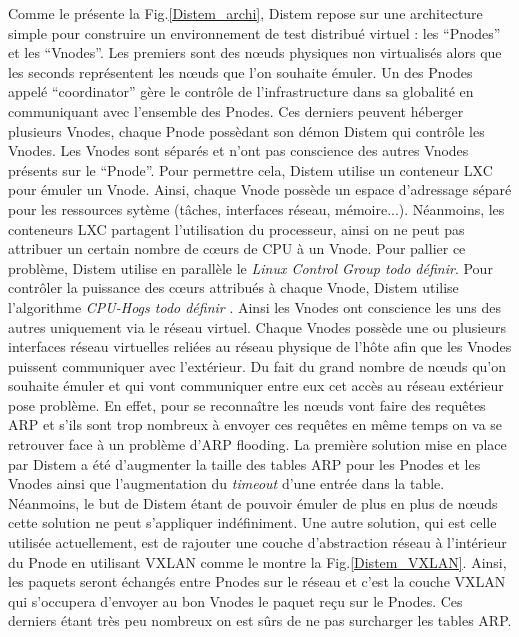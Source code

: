 Comme le présente la Fig.\ref{Distem_archi}, Distem repose sur une architecture simple pour construire un environnement de test distribué virtuel : les ``Pnodes'' et les ``Vnodes''. Les premiers sont des n\oe uds physiques non virtualisés alors que les seconds représentent les n\oe uds que l'on souhaite émuler. Un des Pnodes appelé ``coordinator'' gère le contrôle de l'infrastructure dans sa globalité en communiquant avec l'ensemble des Pnodes. Ces derniers peuvent héberger plusieurs Vnodes, chaque Pnode possèdant son démon Distem qui contrôle les Vnodes. Les Vnodes sont séparés et n'ont pas conscience des autres Vnodes présents sur le ``Pnode''. Pour permettre cela, Distem utilise un conteneur LXC pour émuler un Vnode. Ainsi, chaque Vnode possède un espace d'adressage séparé pour les ressources sytème (tâches, interfaces réseau, mémoire...). Néanmoins, les conteneurs LXC partagent l'utilisation du processeur, ainsi on ne peut pas attribuer un certain nombre de c\oe urs de CPU à un Vnode. Pour pallier ce problème, Distem utilise en parallèle le \textit{Linux Control Group{\color{red} todo définir}}. Pour contrôler la puissance des c\oe urs attribués à chaque Vnode, Distem utilise l'algorithme \textit{CPU-Hogs{\color{red} todo définir}} \citep{DISTEM_buchert2011methods}. Ainsi les Vnodes ont conscience les uns des autres uniquement via le réseau virtuel. Chaque Vnodes possède une ou plusieurs interfaces réseau virtuelles reliées au réseau physique de l'hôte afin que les Vnodes puissent communiquer avec l'extérieur. Du fait du grand nombre de n\oe uds qu'on souhaite émuler et qui vont communiquer entre eux cet accès au réseau extérieur pose problème. En effet, pour se reconnaître les n\oe uds vont faire des requêtes ARP et s'ils sont trop nombreux à envoyer ces requêtes en même temps on va se retrouver face à un problème d'ARP flooding. La première solution mise en place par Distem a été d'augmenter la taille des tables ARP pour les Pnodes et les Vnodes ainsi que l'augmentation du \textit{timeout} d'une entrée dans la table. Néanmoins, le but de Distem étant de pouvoir émuler de plus en plus de n\oe uds cette solution ne peut s'appliquer indéfiniment. Une autre solution, qui est celle utilisée actuellement, est de rajouter une couche d'abstraction réseau à l'intérieur du Pnode en utilisant VXLAN\citep{VXLAN_mahalingam2014virtual, DISTEM_buchert2014emulation} comme le montre la Fig.\ref{Distem_VXLAN}. Ainsi, les paquets seront échangés entre Pnodes sur le réseau et c'est la couche VXLAN qui s'occupera d'envoyer au bon Vnodes le paquet reçu sur le Pnodes. Ces derniers étant très peu nombreux on est sûrs de ne pas surcharger les tables ARP.

